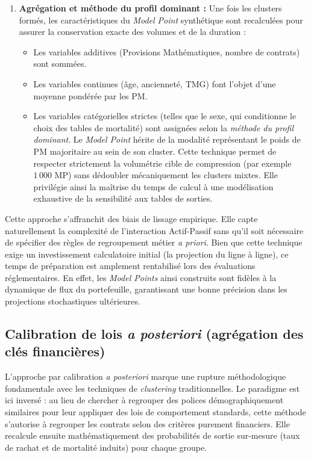 \begin{enumerate}
    \item \textbf{Agrégation et méthode du profil dominant :} 
    Une fois les clusters formés, les caractéristiques du \textit{Model Point} synthétique sont recalculées pour assurer la conservation exacte des volumes et de la duration :
    \begin{itemize}
        \item Les variables additives (Provisions Mathématiques, nombre de contrats) sont sommées.
        \item Les variables continues (âge, ancienneté, TMG) font l'objet d'une moyenne pondérée par les PM.
        \item Les variables catégorielles strictes (telles que le sexe, qui conditionne le choix des tables de mortalité) sont assignées selon la \textit{méthode du profil dominant}. Le \textit{Model Point} hérite de la modalité représentant le poids de PM majoritaire au sein de son cluster. Cette technique permet de respecter strictement la volumétrie cible de compression (par exemple $1\,000$ MP) sans dédoubler mécaniquement les clusters mixtes. Elle privilégie ainsi la maîtrise du temps de calcul à une modélisation exhaustive de la sensibilité aux tables de sorties.
    \end{itemize}
\end{enumerate}

Cette approche s'affranchit des biais de lissage empirique. Elle capte naturellement la complexité de l'interaction Actif-Passif sans qu'il soit nécessaire de spécifier des règles de regroupement métier \textit{a priori}. Bien que cette technique exige un investissement calculatoire initial (la projection du ligne à ligne), ce temps de préparation est amplement rentabilisé lors des évaluations réglementaires. En effet, les \textit{Model Points} ainsi construits sont fidèles à la dynamique de flux du portefeuille, garantissant une bonne précision dans les projections stochastiques ultérieures.

\subsection{Calibration de lois \textit{a posteriori} (agrégation des clés financières)}
\label{sec:calib_a_posteriori}

L'approche par calibration \textit{a posteriori} marque une rupture méthodologique fondamentale avec les techniques de \textit{clustering} traditionnelles. Le paradigme est ici inversé : au lieu de chercher à regrouper des polices démographiquement similaires pour leur appliquer des lois de comportement standards, cette méthode s'autorise à regrouper les contrats selon des critères purement financiers. Elle recalcule ensuite mathématiquement des probabilités de sortie \og sur-mesure \fg{} (taux de rachat et de mortalité induits) pour chaque groupe.

